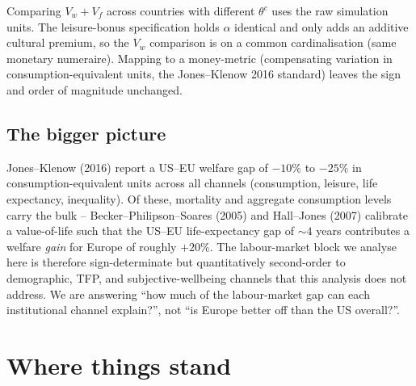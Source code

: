 \documentclass[11pt,a4paper]{article}
\begin{document}
Comparing $V_w + V_f$ across countries with different $\theta^c$ uses
the raw simulation units. The leisure-bonus specification holds
$\alpha$ identical and only adds an additive cultural premium, so the
$V_w$ comparison is on a common cardinalisation (same monetary
numeraire). Mapping to a money-metric (compensating variation in
consumption-equivalent units, the Jones--Klenow 2016 standard) leaves
the sign and order of magnitude unchanged.

\subsection{The bigger picture}

Jones--Klenow (2016) report a US--EU welfare gap of $-10\%$ to $-25\%$
in consumption-equivalent units across all channels (consumption,
leisure, life expectancy, inequality). Of these, mortality and aggregate
consumption levels carry the bulk -- Becker--Philipson--Soares (2005)
and Hall--Jones (2007) calibrate a value-of-life such that the
US--EU life-expectancy gap of $\sim 4$ years contributes a welfare
\emph{gain} for Europe of roughly $+20\%$. The labour-market block we
analyse here is therefore sign-determinate but quantitatively
second-order to demographic, TFP, and subjective-wellbeing channels
that this analysis does not address. We are answering ``how much of
the labour-market gap can each institutional channel explain?'',
not ``is Europe better off than the US overall?''.

\section{Where things stand}
\end{document}
